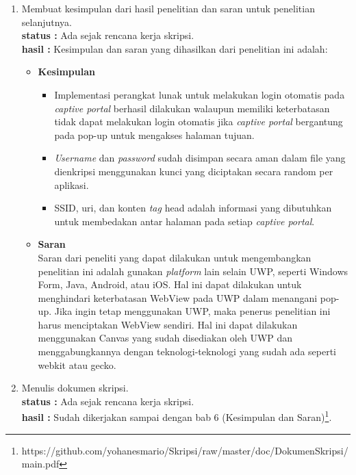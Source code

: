 \documentclass[a4paper,twoside]{article}
\begin{document}
\begin{enumerate}
        \item Membuat kesimpulan dari hasil penelitian dan saran untuk penelitian selanjutnya.\\
		{\bf status :} Ada sejak rencana kerja skripsi.\\
		{\bf hasil :} Kesimpulan dan saran yang dihasilkan dari penelitian ini adalah:
        \begin{itemize}
            \item{
                {\bf Kesimpulan}
                \begin{itemize}
                    \item{Implementasi perangkat lunak untuk melakukan login otomatis pada \textit{captive portal} berhasil dilakukan walaupun memiliki keterbatasan tidak dapat melakukan login otomatis jika \textit{captive portal} bergantung pada pop-up untuk mengakses halaman tujuan.}
                    \item{\textit{Username} dan \textit{password} sudah disimpan secara aman dalam file yang dienkripsi menggunakan kunci yang diciptakan secara random per aplikasi.}
                    \item{SSID, uri, dan konten \textit{tag} head adalah informasi yang dibutuhkan untuk membedakan antar halaman pada setiap \textit{captive portal}.}
                \end{itemize}
            }
            \item{
                {\bf Saran}\\
                Saran dari peneliti yang dapat dilakukan untuk mengembangkan penelitian ini adalah gunakan \textit{platform} lain selain UWP, seperti Windows Form, Java, Android, atau iOS. Hal ini dapat dilakukan untuk menghindari keterbatasan WebView pada UWP dalam menangani pop-up. Jika ingin tetap menggunakan UWP, maka penerus penelitian ini harus menciptakan WebView sendiri. Hal ini dapat dilakukan menggunakan Canvas yang sudah disediakan oleh UWP dan menggabungkannya dengan teknologi-teknologi yang sudah ada seperti webkit atau gecko.
            }
        \end{itemize}

		\item Menulis dokumen skripsi.\\
		{\bf status :} Ada sejak rencana kerja skripsi.\\
		{\bf hasil :} Sudah dikerjakan sampai dengan bab 6 (Kesimpulan dan Saran)\footnote{https://github.com/yohanesmario/Skripsi/raw/master/doc/DokumenSkripsi/main.pdf}.

	\end{enumerate}
\end{document}
